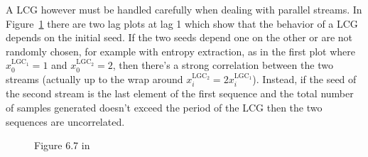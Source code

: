 \documentclass[10pt]{article}
\begin{document}
A LCG however must be handled carefully when dealing with parallel streams. In Figure~\ref{fig:67} there are two lag plots at lag 1 which show that the behavior of a LCG depends on the initial seed. If the two seeds depend one on the other or are not randomly chosen, for example with entropy extraction, as in the first plot where $x_0^{\text{LGC}_1} = 1$ and $x_0^{\text{LGC}_2} = 2$, then there's a strong correlation between the two streams (actually up to the wrap around $x_i^{\text{LGC}_2} = 2x_i^{\text{LGC}_1}$). Instead, if the seed of the second stream is the last element of the first sequence and the total number of samples generated doesn't exceed the period of the LCG then the two sequences are uncorrelated.
\begin{figure}
  \centering
  \caption{Figure 6.7 in \cite{leb}}
  \label{fig:67}
\end{figure}
\end{document}
